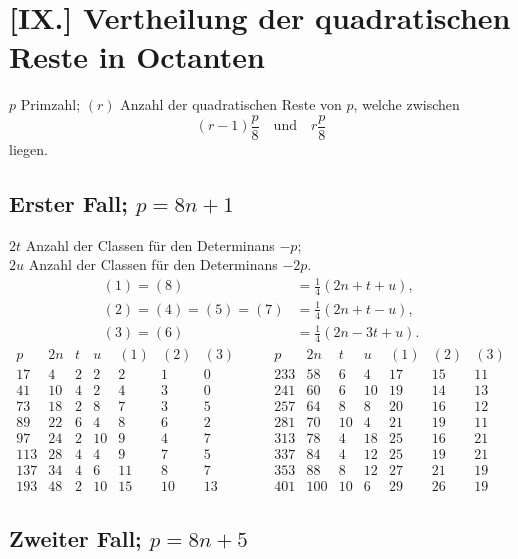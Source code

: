 \documentclass[12pt]{article}
\begin{document}

\section*{[IX.] Vertheilung der quadratischen Reste in Octanten}

$p$ Primzahl; $(r)$ Anzahl der quadratischen Reste von $p$, welche zwischen
\[
(r-1)\frac{p}{8}\quad \text{und}\quad r\frac{p}{8}
\]
liegen.

\subsection*{Erster Fall; \(p=8n+1\)}

$2t$ Anzahl der Classen für den Determinans $-p$;\\
$2u$ Anzahl der Classen für den Determinans $-2p$.
\[
\begin{aligned}
(1)=(8)&=\frac14(2n+t+u),\\
(2)=(4)=(5)=(7)&=\frac14(2n+t-u),\\
(3)=(6)&=\frac14(2n-3t+u).
\end{aligned}
\]
{\scriptsize
\[
\begin{array}{r|r|r|r|r|r|r}
p&2n&t&u&(1)&(2)&(3)\\\hline
17&4&2&2&2&1&0\\
41&10&4&2&4&3&0\\
73&18&2&8&7&3&5\\
89&22&6&4&8&6&2\\
97&24&2&10&9&4&7\\
113&28&4&4&9&7&5\\
137&34&4&6&11&8&7\\
193&48&2&10&15&10&13
\end{array}
\qquad
\begin{array}{r|r|r|r|r|r|r}
p&2n&t&u&(1)&(2)&(3)\\\hline
233&58&6&4&17&15&11\\
241&60&6&10&19&14&13\\
257&64&8&8&20&16&12\\
281&70&10&4&21&19&11\\
313&78&4&18&25&16&21\\
337&84&4&12&25&19&21\\
353&88&8&12&27&21&19\\
401&100&10&6&29&26&19
\end{array}
\]
}

\subsection*{Zweiter Fall; \(p=8n+5\)}
\end{document}
